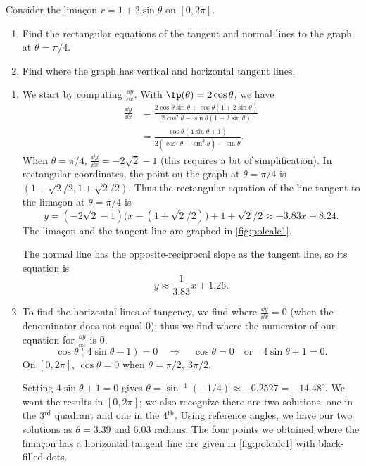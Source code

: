 
\begin{example}\label{ex_polcalc1}%
Consider the limaçon $r=1+2\sin\theta$ on $[0,2\pi]$.
\begin{enumerate}
	\item	Find the rectangular equations of the tangent and normal lines to the graph at $\theta=\pi/4$.
	\item	Find where the graph has vertical and horizontal tangent lines.
\end{enumerate}
\solution
\begin{enumerate}
	\item We start by computing $\frac{\dd y}{\dd x}$. With $\fp(\theta) = 2\cos\theta$, we have
	\begin{align*}
	\frac{\dd y}{\dd x} &= \frac{2\cos\theta\sin\theta + \cos\theta(1+2\sin\theta)}{2\cos^2\theta-\sin\theta(1+2\sin\theta)}\\
	&= \frac{\cos\theta(4\sin\theta+1)}{2(\cos^2\theta-\sin^2\theta)-\sin\theta}.
	\end{align*}
	When $\theta=\pi/4$, $\frac{\dd y}{\dd x}=-2\sqrt{2}-1$ (this requires a bit of simplification). In rectangular coordinates, the point on the graph at $\theta=\pi/4$ is $(1+\sqrt{2}/2,1+\sqrt{2}/2)$. Thus the rectangular equation of the line tangent to the limaçon at $\theta=\pi/4$ is 
\[y=(-2\sqrt{2}-1)\bigl(x-(1+\sqrt{2}/2)\bigr)+1+\sqrt{2}/2 \approx  -3.83 x+8.24.\]
The limaçon and the tangent line are graphed in \autoref{fig:polcalc1}. 
	
	The normal line has the opposite-reciprocal slope as the tangent line, so its equation is 
\[y \approx \frac{1}{3.83}x+1.26.\]
	
	\item		To find the horizontal lines of tangency, we find where $\frac{\dd y}{\dd x}=0$ (when the denominator does not equal 0); thus we find where the numerator of our equation for $\frac{\dd y}{\dd x}$ is 0.
	\[\cos\theta(4\sin\theta+1)=0\quad \Rightarrow \quad \cos\theta=0 \quad \text{or}\quad 4\sin\theta+1=0.\]
	On $[0,2\pi]$, $\cos\theta=0$ when $\theta=\pi/2,\ 3\pi/2$. 

Setting $4\sin\theta+1=0$ gives $\theta=\sin^{-1}(-1/4)\approx -0.2527 = -14.48^\circ$. We want the results in $[0,2\pi]$; we also recognize there are two solutions, one in the 3$^\text{rd}$ quadrant and one in the 4$^\text{th}$. Using reference angles, we have our two solutions as $\theta =3.39$ and $6.03$ radians. The four points we obtained where the limaçon has a horizontal tangent line are given in \autoref{fig:polcalc1} with black-filled dots.\bigskip


\end{enumerate}
\end{example}

